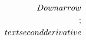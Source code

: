 \documentclass[preview]{standalone}
\begin{document}
\begin{align*}
\special{dvisvgm:raw <g id='unique000'>}\\Downarrow\\;\\text{second derivative}\special{dvisvgm:raw </g>}
\end{align*}
\end{document}
